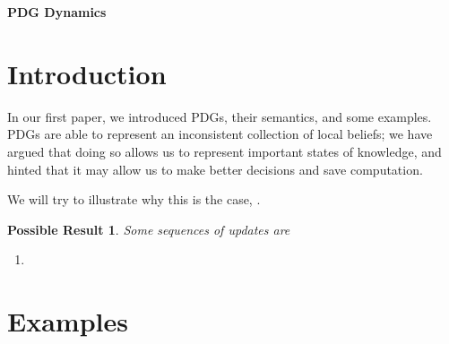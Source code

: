 \documentclass{article}
\theoremstyle{plain}
\newtheorem{poss}{Possible Result}
\theoremstyle{definition}
\begin{document}
\begin{center}
	{\bfseries\Large PDG Dynamics}
\end{center}	
	
\section{Introduction}
In our first paper, we introduced PDGs, their semantics, and some examples. 
PDGs are able to represent an inconsistent collection of local beliefs; we have argued that doing so allows us to represent important states of knowledge, and hinted that it may allow us to make better decisions and save computation. 

We will try to illustrate why this is the case, . 


\begin{poss}
	Some sequences of updates are 
\end{poss}



\begin{enumerate}
	\item 
\end{enumerate}


\section{Examples}
\end{document}
